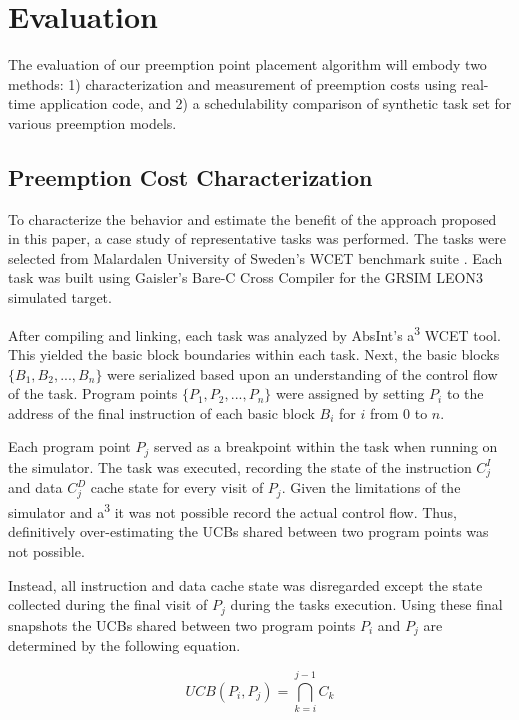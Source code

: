 \section{Evaluation}\label{sec:evaluation}

The evaluation of our preemption point placement algorithm will embody
two methods: 1) characterization and measurement of preemption costs
using real-time application code, and 2) a schedulability comparison
of synthetic task set for various preemption models. 

\subsection {Preemption Cost
  Characterization}\label{sec:preemption_cost_measurement} 
To characterize the behavior and estimate the benefit of the approach
proposed in this paper, a case study of representative tasks was
performed. The tasks were selected from Malardalen University of
Sweden's WCET benchmark suite \cite{mrtc:01}. Each task was built using Gaisler's
Bare-C Cross Compiler \cite{gaisler:01} for the GRSIM
LEON3 \cite{gaisler:02} simulated target. 

After compiling and linking, each task was analyzed by AbsInt's
a\textsuperscript{3} WCET \cite{absint:01} tool. This yielded the basic block
boundaries within each task. Next, the basic blocks
${\{B_1, B_2, ..., B_n\}}$ were serialized based upon an understanding of
the control flow of the task. Program points
${\{P_1, P_2, ..., P_n\}}$ were assigned by setting ${P_i}$ to the
address of the final instruction of each basic block ${B_i}$ for ${i}$
from ${0}$ to ${n}$.

Each program point ${P_j}$ served as a breakpoint within the task when
running on the simulator. The task was executed, recording the state of
the instruction ${C^I_j}$ and data ${C^D_j}$ cache state for every
visit of ${P_j}$. Given the limitations of the simulator and
a\textsuperscript{3} it was not possible record the actual control
flow. Thus, definitively over-estimating the UCBs shared between two
program points was not possible.

Instead, all instruction and data cache state was disregarded except
the state collected during the final visit of ${P_j}$ during the tasks
execution. Using these final snapshots the UCBs shared between two
program points ${P_i}$ and ${P_j}$ are determined by the following
equation. 
\begin{center}
  \begin{equation*}
    UCB(P_i, P_j) = \bigcap_{k=i}^{j-1} C_k
  \end{equation*}
\end{center}

